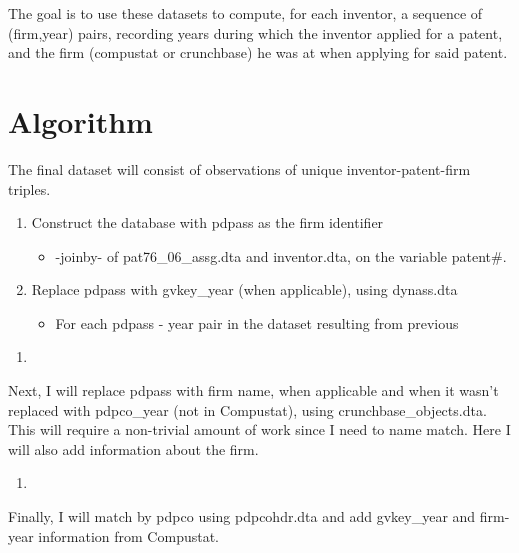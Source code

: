 \documentclass[12pt,english]{article}
\theoremstyle{remark}
\begin{document}
The goal is to use these datasets to compute, for each inventor, a sequence of (firm,year) pairs, recording years during which the inventor applied for a patent, and the firm (compustat or crunchbase) he was at when applying for said patent. 

\section{Algorithm}

The final dataset will consist of observations of unique inventor-patent-firm triples.

\begin{enumerate}
	\item Construct the database with pdpass as the firm identifier
	\begin{itemize}
		\item -joinby- of pat76\_06\_assg.dta and inventor.dta, on the variable patent\#.
	\end{itemize}
	\item Replace pdpass with gvkey\_year (when applicable), using dynass.dta
	\begin{itemize}
		\item For each pdpass - year pair in the dataset resulting from previous
	\end{itemize}
\end{enumerate}







\begin{enumerate}
	\item
\end{enumerate}


Next, I will replace pdpass with firm name, when applicable and when it wasn't replaced with pdpco\_year (not in Compustat), using crunchbase\_objects.dta. This will require a non-trivial amount of work since I need to name match. Here I will also add information about the firm.

\begin{enumerate}
	\item
\end{enumerate}

Finally, I will match by pdpco using pdpcohdr.dta and add gvkey\_year and firm-year information from Compustat. 
\end{document}
